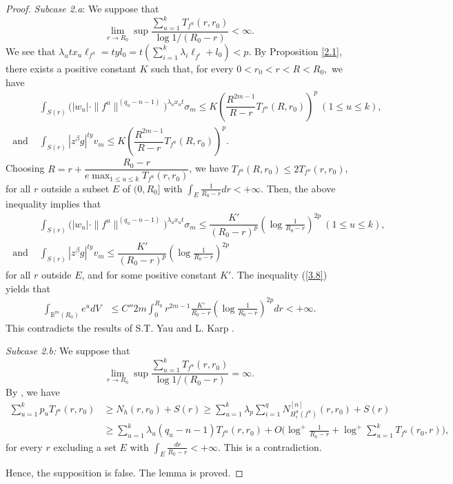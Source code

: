 \documentclass[12pt, a4paper, oneside]{amsart}
\newcommand{\B}{\mathbb{B}}
\numberwithin{equation}{section}
\begin{document}
\begin{proof}
	\textit{Subcase 2.a}: We suppose that
	$$ \lim\limits_{r\rightarrow R_0}\sup\dfrac{\sum_{u=1}^kT_{f^u}(r,r_0)}{\log 1/(R_0-r)}<\infty .$$
	We see that $\lambda_utx_u\ell_{f^u}=tyl_0=t(\sum_{i=1}^k\lambda_i\ell_{f^i}+l_0)<p$. By Proposition \ref{2.1}, there exists a positive constant $K$ such that, for every $0<r_0<r<R< R_0,$ we have
	\begin{align*}
	&\int_{S(r)}\bigl (|w_u|\cdot\|f^u\|^{(q_u-n-1)}\bigl )^{\lambda_ux_ut}\sigma_m\le K\left (\dfrac{R^{2m-1}}{R-r}T_{f^u}(R,r_0)\right )^{p}\ (1\le u\le k),\\
\text{ and }&\int_{S(r)}|z^\beta g|^{ty}v_m\le K\left (\dfrac{R^{2m-1}}{R-r}T_{f^u}(R,r_0)\right )^{p}.
	\end{align*}
	Choosing $R=r+\dfrac{R_0-r}{e\max_{1\le u\le k}T_{f^u}(r,r_0)}$, we have
	$ T_{f^u}(R,r_0)\le 2T_{f^u}(r,r_0)$,
	for all $r$ outside a subset $E$ of $(0,R_0]$ with $\int_E\frac{1}{R_0-r}dr<+\infty$.
	Then, the above inequality implies that
	\begin{align*}
	&\int_{S(r)}\bigl (|w_u|\cdot\|f^u\|^{(q_u-n-1)}\bigl )^{\lambda_ux_ut}\sigma_m\le \dfrac{K'}{(R_0-r)^{p}}\left (\log\frac{1}{R_0-r}\right )^{2p}\ (1\le u\le k),\\
	\text{ and }&\int_{S(r)}|z^\beta g|^{ty}v_m\le\dfrac{K'}{(R_0-r)^{p}}\left (\log\frac{1}{R_0-r}\right )^{2p}
	\end{align*}
	for all $r$ outside $E$, and for some positive constant $K'$. The inequality (\ref{3.8}) yields that
	\begin{align*}
	\int_{\B^m(R_0)}e^udV&\le C'' 2m\int_0^{R_0}r^{2m-1}\frac{K'}{R_0-r}\left (\log\frac{1}{R_0-r}\right)^{2p}dr< +\infty.
	\end{align*}
	This contradicts the results of S.T. Yau \cite{Y76} and L. Karp \cite{K82}. 
	
	\textit{Subcase 2.b:} We suppose that 
	$$ \lim\limits_{r\rightarrow R_0} \sup\dfrac{\sum_{u=1}^kT_{f^u}(r,r_0)}{\log 1/(R_0-r)}= \infty.$$
	By \cite[Proposition 6.2]{Fu85}, we have
	\begin{align*}
	\sum_{u=1}^kp_uT_{f^u}(r,r_0)&\ge N_h(r,r_0)+S(r)\ge\sum_{u=1}^k\lambda_p\sum_{i=1}^qN_{H^u_i(f^u)}^{[n]}(r,r_0)+S(r)\\ 
	&\ge \sum_{u=1}^k\lambda_u(q_u-n-1)T_{f^u}(r,r_0)+O\bigl(\log^+\frac{1}{R_0-r}+\log^+\sum_{u=1}^kT_{f^u}(r_0,r)\bigl), 
	\end{align*}
	for every $r$ excluding a set $E$ with $\int_E\frac{dr}{R_0-r}<+\infty$. This is a contradiction.

	Hence, the supposition is false. The lemma is proved.
\end{proof}
\end{document}
